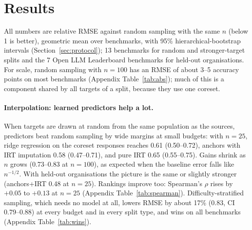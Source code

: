 \section{Results}
\label{sec:results}
All numbers are relative RMSE against random sampling with the same $n$ (below 1 is better), geometric mean over benchmarks, with 95\% hierarchical-bootstrap intervals (Section~\ref{sec:protocol}); 13 benchmarks for random and stronger-target splits and the 7 Open LLM Leaderboard benchmarks for held-out organisations. For scale, random sampling with $n=100$ has an RMSE of about 3--5 accuracy points on most benchmarks (Appendix Table~\ref{tab:abs}); much of this is a component shared by all targets of a split, because they use one coreset.

\begin{table}[t]
\caption{Relative RMSE vs.\ random sampling (geometric mean over benchmarks; 95\% CI). Rows above the rule are baselines; ``ours'' are the components proposed here; AUTO is source-only pseudo-shift tuning. Best entries per column in the interpolation settings are the learned predictors; in the extrapolation setting they are the recalibrated/residual-corrected estimators. The held-out-organisation column covers 7 benchmarks, the others 13. Full results for all five budgets are in Appendix Table~\ref{tab:full}.}
\label{tab:main}
\centering\scriptsize\setlength{\tabcolsep}{3.2pt}

\end{table}

\paragraph{Interpolation: learned predictors help a lot.}
When targets are drawn at random from the same population as the sources, predictors beat random sampling by wide margins at small budgets: with $n=25$, ridge regression on the coreset responses reaches 0.61 (0.50--0.72), anchors with IRT imputation 0.58 (0.47--0.71), and pure IRT 0.65 (0.55--0.75). Gains shrink as $n$ grows (0.73--0.83 at $n=100$), as expected when the baseline error falls like $n^{-1/2}$. With held-out organisations the picture is the same or slightly stronger (anchors+IRT 0.48 at $n=25$). Rankings improve too: Spearman's $\rho$ rises by $+0.05$ to $+0.13$ at $n=25$ (Appendix Table~\ref{tab:spearman}). Difficulty-stratified sampling, which needs no model at all, lowers RMSE by about 17\% (0.83, CI 0.79--0.88) at every budget and in every split type, and wins on all benchmarks (Appendix Table~\ref{tab:wins}).

